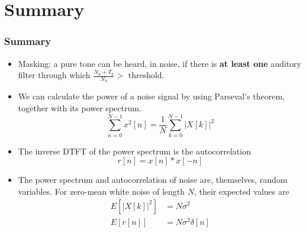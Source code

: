 \documentclass{beamer}
\begin{document}
\section[Summary]{Summary}
\setcounter{subsection}{1}

\begin{frame}
  \frametitle{Summary}
  \begin{itemize}
  \item Masking: a pure tone can be heard, in noise, if there is {\bf at least one}
    auditory filter through which $\frac{N_k+T_k}{N_k}>$ threshold.
  \item We can calculate the power of a noise signal by using Parseval's theorem, together with
    its power spectrum.
    \[
    \sum_{n=0}^{N-1}x^2[n] = \frac{1}{N}\sum_{k=0}^{N-1}|X[k]|^2
    \]
  \item The inverse DTFT of the power spectrum is the autocorrelation
    \[
    r[n] = x[n]\ast x[-n]
    \]
  \item The power spectrum and autocorrelation of noise are, themselves, random variables.
    For zero-mean white noise of length $N$, their expected values are
    \begin{align*}
      E\left[|X[k]|^2\right] &= N\sigma^2\\
      E\left[r[n]\right] &= N\sigma^2\delta[n]
    \end{align*}
  \end{itemize}
\end{frame}
\end{document}
